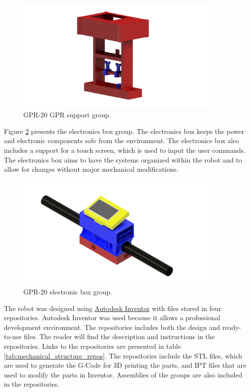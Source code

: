 \documentclass{article}
\begin{document}
\begin{figure}[h]
    \centering
    \includegraphics[width=0.9\textwidth]{images/groups/vna_holder.png}
    \caption{GPR-20 GPR support group.}
    \label{fig:gpr_support}
\end{figure}

Figure \ref{fig:electronics_box} presents the electronics box group. The electronics box keeps the power and electronic components safe from the environment. The electronics box also includes a support for a touch screen, which is used to input the user commands. The electronics box aims to have the systems organized within the robot and to allow for changes without major mechanical modifications. 

\begin{figure}[h]
    \centering
    \includegraphics[width=0.9\textwidth]{images/groups/electronics_box.png}
    \caption{GPR-20 electronic box group.}
    \label{fig:electronics_box}
\end{figure}

The robot was designed using \href{https://www.autodesk.com/products/inventor/overview}{Autodesk Inventor} with files stored in four repositories. Autodesk Inventor was used because it allows a professional development environment. The repositories includes both the design and ready-to-use files. The reader will find the description and instructions in the repositories. Links to the repositories are presented in table \ref{tab:mechanical_structure_repos}. The repositories include the STL files, which are used to generate the G-Code for 3D printing the parts, and IPT files that are used to modify the parts in Inventor. Assemblies of the groups are also included in the repositories.
\end{document}
